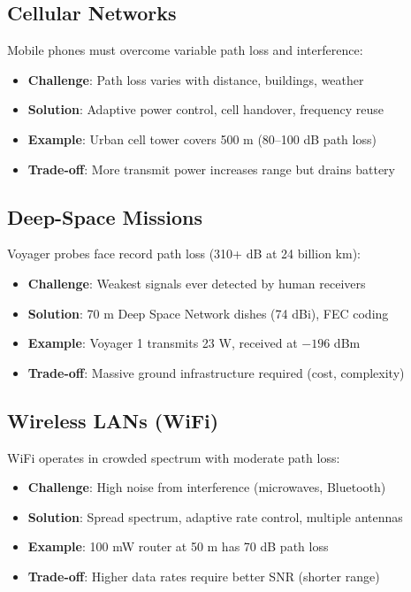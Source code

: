 \subsection{Cellular Networks}

Mobile phones must overcome variable path loss and interference:
\begin{itemize}
\item \textbf{Challenge}: Path loss varies with distance, buildings, weather
\item \textbf{Solution}: Adaptive power control, cell handover, frequency reuse
\item \textbf{Example}: Urban cell tower covers 500 m (80--100 dB path loss)
\item \textbf{Trade-off}: More transmit power increases range but drains battery
\end{itemize}

\subsection{Deep-Space Missions}

Voyager probes face record path loss (310+ dB at 24 billion km):
\begin{itemize}
\item \textbf{Challenge}: Weakest signals ever detected by human receivers
\item \textbf{Solution}: 70 m Deep Space Network dishes (74 dBi), FEC coding
\item \textbf{Example}: Voyager 1 transmits 23 W, received at $-196$ dBm
\item \textbf{Trade-off}: Massive ground infrastructure required (cost, complexity)
\end{itemize}

\subsection{Wireless LANs (WiFi)}

WiFi operates in crowded spectrum with moderate path loss:
\begin{itemize}
\item \textbf{Challenge}: High noise from interference (microwaves, Bluetooth)
\item \textbf{Solution}: Spread spectrum, adaptive rate control, multiple antennas
\item \textbf{Example}: 100 mW router at 50 m has 70 dB path loss
\item \textbf{Trade-off}: Higher data rates require better SNR (shorter range)
\end{itemize}

